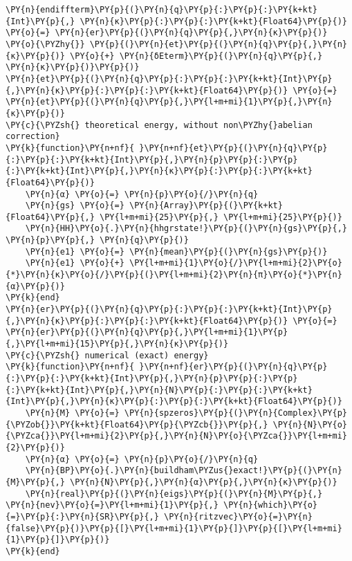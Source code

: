 \begin{Verbatim}[commandchars=\\\{\}]
\PY{n}{endiffterm}\PY{p}{(}\PY{n}{q}\PY{p}{:}\PY{p}{:}\PY{k+kt}{Int}\PY{p}{,} \PY{n}{κ}\PY{p}{:}\PY{p}{:}\PY{k+kt}{Float64}\PY{p}{)} \PY{o}{=} \PY{n}{er}\PY{p}{(}\PY{n}{q}\PY{p}{,}\PY{n}{κ}\PY{p}{)} \PY{o}{\PYZhy{}} \PY{p}{(}\PY{n}{et}\PY{p}{(}\PY{n}{q}\PY{p}{,}\PY{n}{κ}\PY{p}{)} \PY{o}{+} \PY{n}{δEterm}\PY{p}{(}\PY{n}{q}\PY{p}{,} \PY{n}{κ}\PY{p}{)}\PY{p}{)}
\PY{n}{et}\PY{p}{(}\PY{n}{q}\PY{p}{:}\PY{p}{:}\PY{k+kt}{Int}\PY{p}{,}\PY{n}{κ}\PY{p}{:}\PY{p}{:}\PY{k+kt}{Float64}\PY{p}{)} \PY{o}{=}  \PY{n}{et}\PY{p}{(}\PY{n}{q}\PY{p}{,}\PY{l+m+mi}{1}\PY{p}{,}\PY{n}{κ}\PY{p}{)}
\PY{c}{\PYZsh{} theoretical energy, without non\PYZhy{}abelian correction}
\PY{k}{function}\PY{n+nf}{ }\PY{n+nf}{et}\PY{p}{(}\PY{n}{q}\PY{p}{:}\PY{p}{:}\PY{k+kt}{Int}\PY{p}{,}\PY{n}{p}\PY{p}{:}\PY{p}{:}\PY{k+kt}{Int}\PY{p}{,}\PY{n}{κ}\PY{p}{:}\PY{p}{:}\PY{k+kt}{Float64}\PY{p}{)}
    \PY{n}{α} \PY{o}{=} \PY{n}{p}\PY{o}{/}\PY{n}{q}
    \PY{n}{gs} \PY{o}{=} \PY{n}{Array}\PY{p}{(}\PY{k+kt}{Float64}\PY{p}{,} \PY{l+m+mi}{25}\PY{p}{,} \PY{l+m+mi}{25}\PY{p}{)}
    \PY{n}{HH}\PY{o}{.}\PY{n}{hhgrstate!}\PY{p}{(}\PY{n}{gs}\PY{p}{,} \PY{n}{p}\PY{p}{,} \PY{n}{q}\PY{p}{)}
    \PY{n}{e1} \PY{o}{=} \PY{n}{mean}\PY{p}{(}\PY{n}{gs}\PY{p}{)}
    \PY{n}{e1} \PY{o}{+} \PY{l+m+mi}{1}\PY{o}{/}\PY{l+m+mi}{2}\PY{o}{*}\PY{n}{κ}\PY{o}{/}\PY{p}{(}\PY{l+m+mi}{2}\PY{n}{π}\PY{o}{*}\PY{n}{α}\PY{p}{)}
\PY{k}{end}
\PY{n}{er}\PY{p}{(}\PY{n}{q}\PY{p}{:}\PY{p}{:}\PY{k+kt}{Int}\PY{p}{,}\PY{n}{κ}\PY{p}{:}\PY{p}{:}\PY{k+kt}{Float64}\PY{p}{)} \PY{o}{=} \PY{n}{er}\PY{p}{(}\PY{n}{q}\PY{p}{,}\PY{l+m+mi}{1}\PY{p}{,}\PY{l+m+mi}{15}\PY{p}{,}\PY{n}{κ}\PY{p}{)}
\PY{c}{\PYZsh{} numerical (exact) energy}
\PY{k}{function}\PY{n+nf}{ }\PY{n+nf}{er}\PY{p}{(}\PY{n}{q}\PY{p}{:}\PY{p}{:}\PY{k+kt}{Int}\PY{p}{,}\PY{n}{p}\PY{p}{:}\PY{p}{:}\PY{k+kt}{Int}\PY{p}{,}\PY{n}{N}\PY{p}{:}\PY{p}{:}\PY{k+kt}{Int}\PY{p}{,}\PY{n}{κ}\PY{p}{:}\PY{p}{:}\PY{k+kt}{Float64}\PY{p}{)}
    \PY{n}{M} \PY{o}{=} \PY{n}{spzeros}\PY{p}{(}\PY{n}{Complex}\PY{p}{\PYZob{}}\PY{k+kt}{Float64}\PY{p}{\PYZcb{}}\PY{p}{,} \PY{n}{N}\PY{o}{\PYZca{}}\PY{l+m+mi}{2}\PY{p}{,}\PY{n}{N}\PY{o}{\PYZca{}}\PY{l+m+mi}{2}\PY{p}{)}
    \PY{n}{α} \PY{o}{=} \PY{n}{p}\PY{o}{/}\PY{n}{q}
    \PY{n}{BP}\PY{o}{.}\PY{n}{buildham\PYZus{}exact!}\PY{p}{(}\PY{n}{M}\PY{p}{,} \PY{n}{N}\PY{p}{,}\PY{n}{α}\PY{p}{,}\PY{n}{κ}\PY{p}{)}
    \PY{n}{real}\PY{p}{(}\PY{n}{eigs}\PY{p}{(}\PY{n}{M}\PY{p}{,} \PY{n}{nev}\PY{o}{=}\PY{l+m+mi}{1}\PY{p}{,} \PY{n}{which}\PY{o}{=}\PY{p}{:}\PY{n}{SR}\PY{p}{,} \PY{n}{ritzvec}\PY{o}{=}\PY{n}{false}\PY{p}{)}\PY{p}{[}\PY{l+m+mi}{1}\PY{p}{]}\PY{p}{[}\PY{l+m+mi}{1}\PY{p}{]}\PY{p}{)}
\PY{k}{end}

\end{Verbatim}
